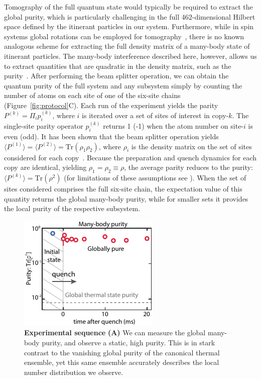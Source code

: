 Tomography of the full quantum state would typically be required to extract the global purity, which is particularly challenging in the full 462-dimensional Hilbert space defined by the itinerant particles in our system. Furthermore, while in spin systems global rotations can be employed for tomography~\cite{Sackett2000}, there is no known analogous scheme for extracting the full density matrix of a many-body state of itinerant particles. The many-body interference described here, however, allows us to extract quantities that are quadratic in the density matrix, such as the purity~\cite{Islam2015}. After performing the beam splitter operation, we can obtain the quantum purity of the full system and any subsystem simply by counting the number of atoms on each site of one of the six-site chains (Figure~\ref{fig:protocol}C). Each run of the experiment yields the parity $P^{(k)} = \Pi_i p^{(k)}_i$, where $i$ is iterated over a set of sites of interest in copy-$k$. The single-site parity operator $p^{(k)}_i$ returns 1 (-1) when the atom number on site-$i$ is even (odd). It has been shown that the beam splitter operation yields $\langle P^{(1)} \rangle = \langle P^{(2)} \rangle = \mathrm{Tr}\left (\rho_1 \rho_2  \right)$, where $\rho_i$ is the density matrix on the set of sites considered for each copy~\cite{JakschPRA, Daley2012,Islam2015}. Because the preparation and quench dynamics for each copy are identical, yielding $\rho_1 = \rho_2 \equiv \rho$, the average parity reduces to the purity: $\langle P^{(k)} \rangle = \mathrm{Tr}(\rho^2)$ (for limitations of these assumptions see \cite{Apendix}). When the set of sites considered comprises the full six-site chain, the expectation value of this quantity returns the global many-body purity, while for smaller sets it provides the local purity of the respective subsystem.

\begin{figure}[h!]
	\centering
	\includegraphics[scale=2]{figures/ETH_purity.pdf}
	\caption{{\bf Experimental sequence} {\bf (A)} We can measure the global many-body purity, and observe a static, high purity. This is in stark contrast to the vanishing global purity of the canonical thermal ensemble, yet this same ensemble accurately describes the local number distribution we observe.
	}
	
	\label{fig:purity}
\end{figure} 

